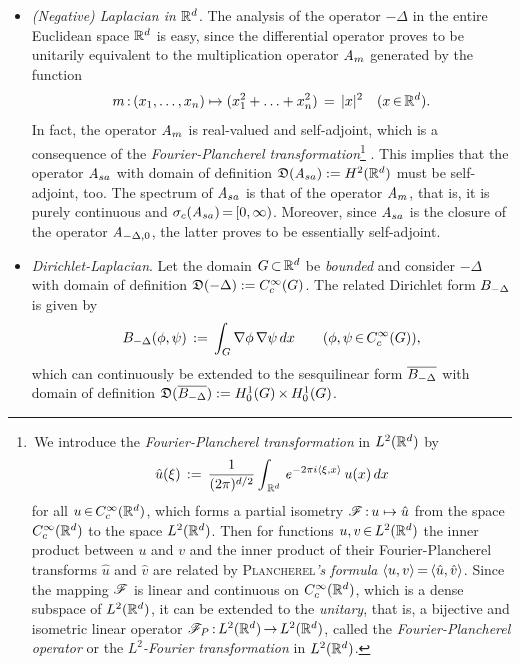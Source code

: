 \documentclass[11pt,twoside]{article}
\begin{document}
\begin{itemize}[leftmargin=17pt]
\begin{itemize}[leftmargin=5mm]
\item[(i)]
\textit{(Negative) Laplacian in ${\mathbb{R}}^d$}.
The analysis of the operator $-\Delta$ in the entire Euclidean space ${\mathbb{R}}^d$
is easy,
since the differential operator proves to be unitarily equivalent to
the multiplication operator $\mathit{A}_m$ generated by the function
\[
m \: (x_1,\ldots,x_n) \mapsto (x_1^2 + \ldots + x_n^2) \= \abs{x} ^2
\quad (x \xeof \Rd).
\]
In fact,
the operator $\mathit{A}_m$ is real-valued and self-adjoint,
which is a consequence of
the \textit{Fourier-Plancherel transformation}\footnote{
\,We introduce the \textit{Fourier-Plancherel transformation} in $L^2({\mathbb{R}}^d)$
by 
\[
\hat{u}(\xi) \,:=\,
\frac{1}{(2 \pi)^{d/2}}
\int_{\,{\mathbb{R}}^d} \, e^{-2 \pi i \langle \xi,x \rangle} \, u(x) \, dx
\]
for all $u {\,\in\,} C_c^{\infty}({\mathbb{R}}^d)$,
which forms a partial isometry $\mathscr{F} {\,:\,} u \mapsto \hat{u} $
from the space $C_c^{\infty}({\mathbb{R}}^d)$ to the space $L^2({\mathbb{R}}^d)$.
Then for functions $u,v {\,\in\,} L^2({\mathbb{R}}^d)$ 
the inner product between $u$ and $v$
and the inner product of their Fourier-Plancherel transforms
$\hat{u}$ and $\hat{v}$ are related by \textsc{Plancherel}\textit{'s formula}
$\langle u,v \rangle {\,=\,} \langle  \hat{u} ,\hat{v}  \rangle$.
Since the mapping $\mathscr{F}$ is linear and continuous on $C_c^{\infty}({\mathbb{R}}^d)$,
which is a dense subspace of $L^2({\mathbb{R}}^d)$,
it can be extended to the \textit{unitary},
that is,
a bijective and isometric linear operator
$\mathscr{F}_P {\,:\,} L^2({\mathbb{R}}^d) {\,\to\,} L^2({\mathbb{R}}^d)$,
called the \textit{Fourier-Plancherel} \textit{operator}
or the \textit{$L^2$-Fourier transformation} in $L^2({\mathbb{R}}^d)$.}
.
This implies
that the operator $\mathit{A}_{sa}$ with domain of definition
$\mathfrak{D}(\mathit{A}_{sa}) := H^2({\mathbb{R}}^d)$ must be self-adjoint,
too.
The spectrum of $\mathit{A}_{sa}$ is that of the operator $\mathit{A}_m$,
that is,
it is purely continuous and $\sigma_c(\mathit{A}_{sa}) {\,=\,} [0,\infty)$.
Moreover,
since $\mathit{A}_{sa}$ is the closure of the operator $\mathit{A}_{-\Delta,0}$,
the latter proves to be essentially self-adjoint.

\item[(ii)]
\textit{Dirichlet-Laplacian}.
Let the domain $G {\,\subset\,} {\mathbb{R}}^d$ be \textit{bounded}
and consider $-\Delta$ with domain of definition $\mathfrak{D}(-\Delta) := C_c^{\infty}(G)$.
The related Dirichlet form $B_{-\Delta}$ is given by 
\[
B_{-\Delta}(\phi,\psi) \,:=\,
\int_{G} \nabla \phi \, \nabla \psi \, dx
\quad \quad
(\phi,\psi {\,\in\,} C_c^{\infty}(G)),
\]
which can continuously be extended to the sesquilinear form
$\overline{B_{-\Delta}}$ with domain of definition
$\mathfrak{D}(\overline{B_{-\Delta}}) := H_0^{1}(G) {\,\times\,} H_0^{1}(G)$.


\end{itemize}
\end{itemize}
\end{document}
